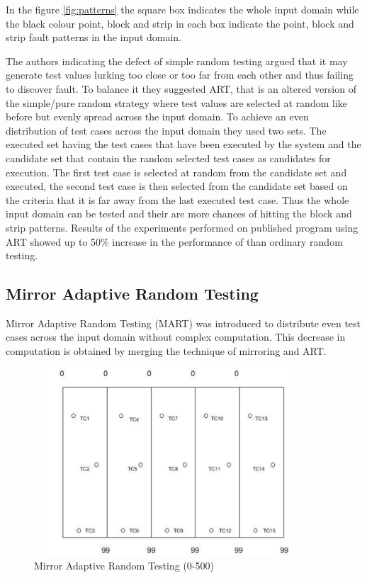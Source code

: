 In the figure \ref{fig:patterns} the square box indicates the whole input domain while the black colour point, block and strip in each box indicate the point, block and strip fault patterns in the input domain.

The authors indicating the defect of simple random testing argued that it may generate test values lurking too close or too far from each other and thus failing to discover fault. To balance it they suggested ART, that is an altered version of the simple/pure random strategy where test values are selected at random like before but evenly spread across the input domain. To achieve an even distribution of test cases across the input domain they used two sets. The executed set having the test cases that have been executed by the system and the candidate set that contain the random selected test cases as candidates for execution. The first test case is selected at random from the candidate set and executed, the second test case is then selected from the candidate set based on the criteria that it is far away from the last executed test case. Thus the whole input domain can be tested and their are more chances of hitting the block and strip patterns. Results of the experiments performed on published program using ART showed up to 50\% increase in the performance of than ordinary random testing.

\subsection{Mirror Adaptive Random Testing}
Mirror Adaptive Random Testing (MART) \cite{Chen2003} was introduced to distribute even test cases across the input domain without complex computation. This decrease in computation is obtained by merging the technique of mirroring and ART.

\begin{figure}[h]
\begin{center}
	\includegraphics[width=10cm, height=7cm ]{Literature/mat}
	\caption{Mirror Adaptive Random Testing (0-500)}
\end{center}  
\end{figure}

